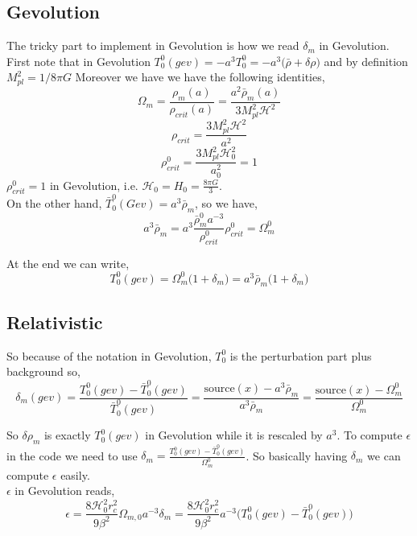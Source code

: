 \documentclass[a4paper,10pt]{article}
\def\be{\begin{equation}}
\def\ee{\end{equation}}
\newcommand{\HH}{\mathcal H}
\begin{document}
\subsection{Gevolution}
The tricky part to implement in Gevolution is how we read $\delta_m$ in Gevolution. \\
 First note that in  Gevolution $T_0^0 (gev)=-a^3 T_0^0 = -a^3 \big(\bar{\rho} + \delta \rho \big) $ and by definition $ M^2_{pl}= 1/8 \pi G$
Moreover we have we have the following identities,
\be
\Omega_m= \frac{\rho_m(a)}{\rho_{crit} (a)} = \frac{a^2 \bar{\rho}_m(a)}{3 M_{pl}^2 \HH^2}
\ee
\be
\rho_{crit} = \frac{3 M_{pl}^2 \HH^2}{a^2}
\ee
\be
\rho_{crit} ^0= \frac{3 M_{pl}^2 \HH_0^2}{a_0^2}=1
\ee
$\rho^{0}_{crit}=1$ in Gevolution,  i.e. $\HH_0 =H_0 = \frac {8 \pi G}{3} $.\\
On the other hand, $\bar{T}_0^0(Gev) = a^3 \bar{\rho}_m$, so we have,
\be
a^3 \bar{\rho}_m = a^3   \frac{\bar{\rho}_m^0 a^{-3} }{\rho_{crit}^0} {\rho_{crit}^0} = \Omega_m^0
\ee

At the end we can write,
\be
T_0^0 (gev) = \Omega_m^0 \Big( 1+ \delta_m \Big) = a^3 \bar{\rho}_m \big(1+ \delta_m \big)
\ee
\subsection{Relativistic}
So because of the notation in Gevolution, $T_0^0$ is  the perturbation part plus background so,
\be
\delta_m(gev) = \frac{ T_0^0 (gev)  - \bar{T}_0^0 (gev) }{ \bar{T}_0^0 (gev)} = \frac{\text{source}(x) -a^3 \bar{\rho}_m }{ a^3 \bar{\rho}_m } = \frac{\text{source}(x)- \Omega_m^0}{ \Omega_m^0}
\ee

So  $\delta \rho_m$ is exactly $T_0^0 (gev)$ in Gevolution while it is rescaled by $a^3$. To compute $\epsilon$ in the code we need to use $\delta_m =  \frac{ T_0^0 (gev)  - \bar{T}_0^0 (gev) } {  \Omega_m^{0}}$.
So basically having $\delta_m$ we can compute $\epsilon$ easily. \\
$\epsilon$ in Gevolution reads,
\be
\epsilon  =  \frac{8 \HH_0^2 r_c^2}{9 \beta^2} \Omega_{m,0} a^{-3} \delta_m = \frac{8 \HH_0^2 r_c^2}{9 \beta^2} a^{-3}  \Big(T_0^0(gev) -  \bar{T}_0^0 (gev)\Big )
\ee
\end{document}
